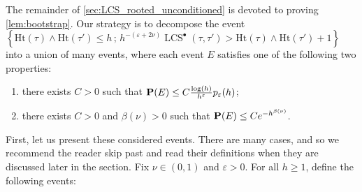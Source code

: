 \documentclass[11pt,reqno]{amsart}
\newcommand{\Ht}{\mathrm{Ht}}
\newcommand{\LCS}{\operatorname{LCS}}
\newcommand{\eps}{\varepsilon}
\begin{document}
The remainder of \cref{sec:LCS_rooted_unconditioned} is devoted to proving \cref{lem:bootstrap}. Our strategy is to decompose the event $\left\{\Ht(\tau)\wedge\Ht(\tau')\leq h\, ;\, h^{-(\eps+2\nu)}\LCS^\bullet(\tau,\tau')> \Ht(\tau)\wedge\Ht(\tau')+1\right\}$ into a union of many events, where each event $E$ satisfies one of the following two properties:
\begin{enumerate}
    \item[(i)] there exists $C > 0$ such that $\mathbf{P}(E) \leq C\frac{\log(h)}{h^\varepsilon}p_\varepsilon(h)$;
    \item[(ii)] there exists $C > 0$ and $\beta(\nu) >0$ such that $\mathbf{P}(E) \leq Ce^{-h^{\beta(\nu)}}$.
\end{enumerate}
First, let us present these considered events. There are many cases, and so we recommend the reader skip past and read their definitions when they are discussed later in the section. Fix $\nu\in(0,1)$ and $\varepsilon>0$. For all $h\geq 1$, define the following events:
\end{document}
